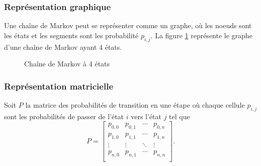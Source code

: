 \documentclass[11pt]{article}
\begin{document}
\subsubsection{Représentation graphique}
Une chaîne de Markov peut se représenter comme un graphe, où les noeuds sont
les états et les segments sont les probabilité $p_{i,j}$. La figure
\ref{fig:markov_graph} représente le graphe d'une chaîne de Markov ayant 4
états.

\begin{figure}[H]
	\centering
	
	\caption{Chaîne de Markov à 4 états}
	\label{fig:markov_graph}
\end{figure}

\subsubsection{Représentation matricielle}
Soit $P$ la matrice des probabilités de transition en une étape où chaque
cellule $p_{i,j}$ sont les probabilités de passer de l'état $i$ vers l'état $j$
tel que
\begin{equation*}
	P=\left[
		\begin{matrix}
			p_{0,0} & p_{0,1} & \cdots & p_{0,n}\\
			p_{1,0} & p_{1,1} & \cdots & p_{1,n}\\
			\vdots  & \vdots  & \ddots & \vdots \\
			p_{n,0} & p_{n,1} & \cdots & p_{n,n}\\
		\end{matrix}
	\right].
\end{equation*}
\end{document}
